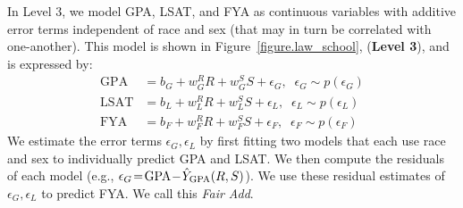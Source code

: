 In Level 3, we model GPA, LSAT, and FYA as continuous variables with additive error terms independent of
race and sex (that may in turn be correlated with one-another). This model is shown in
Figure~\ref{figure.law_school}, (\textbf{Level 3}), and is expressed by: %
\begin{align}
\mbox{GPA} &= b_{G} + w_{G}^R R + w_{G}^S S + \epsilon_G, \;\; \epsilon_G \sim p(\epsilon_G) \nonumber \\
\mbox{LSAT} &= b_{L} + w_{L}^R R + w_{L}^S S + \epsilon_L, \;\; \epsilon_L \sim p(\epsilon_L) \nonumber \\
\mbox{FYA} &= b_{F} + w_{F}^R R + w_{F}^S S + \epsilon_F, \;\; \epsilon_F \sim p(\epsilon_F) \nonumber
\end{align}
We estimate the error terms $\epsilon_G,\epsilon_L$ by first fitting
two models that each use race and sex to individually predict GPA and
LSAT. We then compute the residuals of each model (e.g., $\epsilon_G
\!=\! \mbox{GPA} \!-\! \hat{Y}_{\scriptsize\mbox{GPA}}(R,S)$). We use
these residual estimates of $\epsilon_G,\epsilon_L$ to predict FYA. We
call this \emph{Fair Add}.




